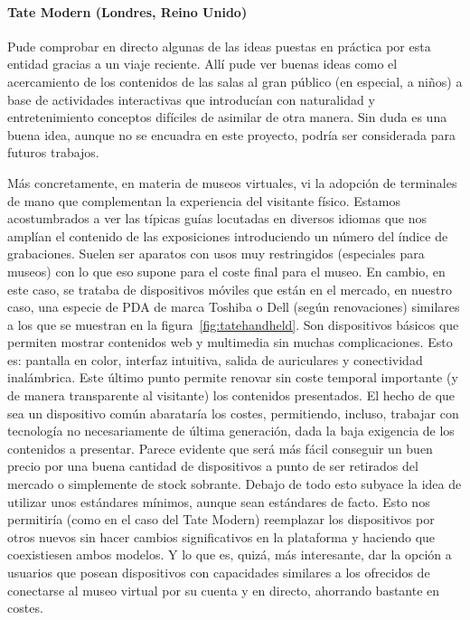 \paragraph{Tate Modern (Londres, Reino Unido)}
\par Pude comprobar en directo algunas de las ideas puestas en práctica por esta entidad gracias a un viaje reciente. Allí pude ver buenas ideas como el acercamiento de los contenidos de las salas al gran público (en especial, a niños) a base de actividades interactivas que introducían con naturalidad y entretenimiento conceptos difíciles de asimilar de otra manera. Sin duda es una buena idea, aunque no se encuadra en este proyecto, podría ser considerada para futuros trabajos.
\par Más concretamente, en materia de museos virtuales, vi la adopción de terminales de mano que complementan la experiencia del visitante físico. Estamos acostumbrados a ver las típicas guías locutadas en diversos idiomas que nos amplían el contenido de las exposiciones introduciendo un número del índice de grabaciones. Suelen ser aparatos con usos muy restringidos (especiales para museos) con lo que eso supone para el coste final para el museo. En cambio, en este caso, se trataba de dispositivos móviles que están en el mercado, en nuestro caso, una especie de PDA de marca Toshiba o Dell (según renovaciones) similares a los que se muestran en la figura~\ref{fig:tatehandheld}. Son dispositivos básicos que permiten mostrar contenidos web y multimedia sin muchas complicaciones. Esto es: pantalla en color, interfaz intuitiva, salida de auriculares y conectividad inalámbrica. Este último punto permite renovar sin coste temporal importante (y de manera transparente al visitante) los contenidos presentados. El hecho de que sea un dispositivo común abarataría los costes, permitiendo, incluso, trabajar con tecnología no necesariamente de última generación, dada la baja exigencia de los contenidos a presentar. Parece evidente que será más fácil conseguir un buen precio por una buena cantidad de dispositivos a punto de ser retirados del mercado o simplemente de stock sobrante.
Debajo de todo esto subyace la idea de utilizar unos estándares mínimos, aunque sean estándares de facto. Esto nos permitiría (como en el caso del Tate Modern) reemplazar los dispositivos por otros nuevos sin hacer cambios significativos en la plataforma y haciendo que coexistiesen ambos modelos. Y lo que es, quizá, más interesante, dar la opción a usuarios que posean dispositivos con capacidades similares a los ofrecidos de conectarse al museo virtual por su cuenta y en directo, ahorrando bastante en costes.

